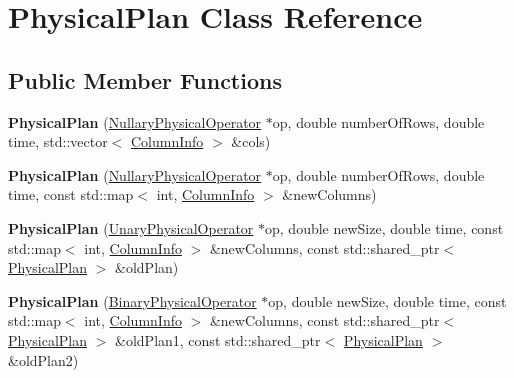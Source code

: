 \hypertarget{class_physical_plan}{\section{Physical\+Plan Class Reference}
\label{class_physical_plan}
}
\subsection*{Public Member Functions}
\begin{DoxyCompactItemize}
\item 
\hypertarget{class_physical_plan_a1cf06adf78f2ccb7cbd2d93b119a25f6}{{\bfseries Physical\+Plan} (\hyperlink{class_nullary_physical_operator}{Nullary\+Physical\+Operator} $\ast$op, double number\+Of\+Rows, double time, std\+::vector$<$ \hyperlink{class_column_info}{Column\+Info} $>$ \&cols)}\label{class_physical_plan_a1cf06adf78f2ccb7cbd2d93b119a25f6}

\item 
\hypertarget{class_physical_plan_a7f1bdc130a27a973a12a2da3b66ca43d}{{\bfseries Physical\+Plan} (\hyperlink{class_nullary_physical_operator}{Nullary\+Physical\+Operator} $\ast$op, double number\+Of\+Rows, double time, const std\+::map$<$ int, \hyperlink{class_column_info}{Column\+Info} $>$ \&new\+Columns)}\label{class_physical_plan_a7f1bdc130a27a973a12a2da3b66ca43d}

\item 
\hypertarget{class_physical_plan_a6b8c83da5833167badf7740947297b75}{{\bfseries Physical\+Plan} (\hyperlink{class_unary_physical_operator}{Unary\+Physical\+Operator} $\ast$op, double new\+Size, double time, const std\+::map$<$ int, \hyperlink{class_column_info}{Column\+Info} $>$ \&new\+Columns, const std\+::shared\+\_\+ptr$<$ \hyperlink{class_physical_plan}{Physical\+Plan} $>$ \&old\+Plan)}\label{class_physical_plan_a6b8c83da5833167badf7740947297b75}

\item 
\hypertarget{class_physical_plan_aad6b6a033d32215d38c720904d16a44e}{{\bfseries Physical\+Plan} (\hyperlink{class_binary_physical_operator}{Binary\+Physical\+Operator} $\ast$op, double new\+Size, double time, const std\+::map$<$ int, \hyperlink{class_column_info}{Column\+Info} $>$ \&new\+Columns, const std\+::shared\+\_\+ptr$<$ \hyperlink{class_physical_plan}{Physical\+Plan} $>$ \&old\+Plan1, const std\+::shared\+\_\+ptr$<$ \hyperlink{class_physical_plan}{Physical\+Plan} $>$ \&old\+Plan2)}\label{class_physical_plan_aad6b6a033d32215d38c720904d16a44e}

\end{DoxyCompactItemize}
